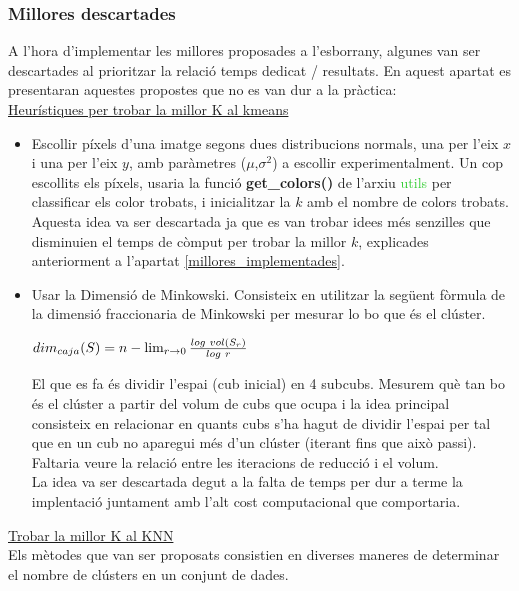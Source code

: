 \documentclass[a4paper, 11pt]{article}
\begin{document}
\subsubsection{Millores descartades}
A l'hora d'implementar les millores proposades a l'esborrany, algunes van ser descartades al prioritzar la relació temps dedicat / resultats. En aquest apartat es presentaran aquestes propostes que no es van dur a la pràctica:\\
\underline{Heurístiques per trobar la millor K al kmeans}
\begin{itemize}
    \item Escollir píxels d'una imatge segons dues distribucions normals, una per l'eix $x$ i una per l'eix $y$, amb paràmetres ($\mu$,$\sigma^2$) a escollir experimentalment. Un cop escollits els píxels, usaria la funció \textbf{\textcolor{funcblue}{get\_colors()}} de l'arxiu \textcolor{LimeGreen}{utils} per classificar els color trobats, i inicialitzar la $k$ amb el nombre de colors trobats.\\
    Aquesta idea va ser descartada ja que es van trobar idees més senzilles que disminuien el temps de còmput per trobar la millor $k$, explicades anteriorment a l'apartat \textcolor{blue}{\ref{millores_implementades}}.
    \item Usar la Dimensió de Minkowski. Consisteix en utilitzar la següent fòrmula de la dimensió fraccionaria de Minkowski per mesurar lo bo que és el clúster. 
    \begin{center}
        $dim_{caja}(S) = n - \lim_{r \to 0} \frac{log \hspace{0.3em}vol(S_r)}{log\hspace{0.3em} r}$ 
    \end{center}
    El que es fa és dividir l'espai (cub inicial) en 4 subcubs. Mesurem què tan bo és el clúster a partir del volum de cubs que ocupa i la idea principal consisteix en relacionar en quants cubs s'ha hagut de dividir l’espai per tal que en un cub no aparegui més d’un clúster (iterant fins que això passi). Faltaria veure la relació entre les iteracions de reducció i el volum.\\
    La idea va ser descartada degut a la falta de temps per dur a terme la implentació juntament amb l'alt cost computacional que comportaria.
\end{itemize}
\underline{Trobar la millor K al KNN}\\
Els mètodes que van ser proposats consistien en diverses maneres de determinar el nombre de clústers en un conjunt de dades.
\end{document}
